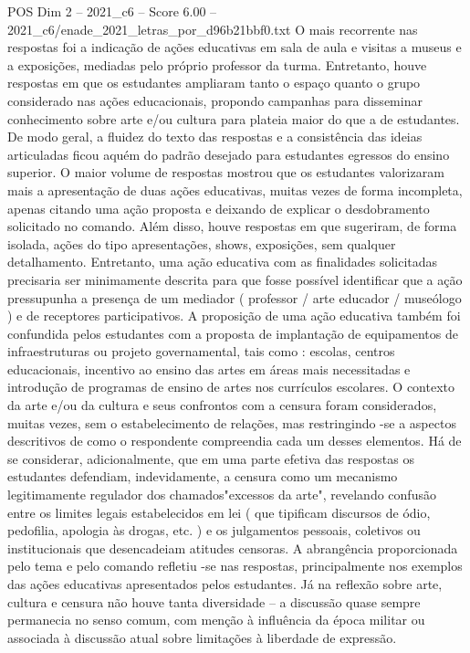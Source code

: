 \begin{textsample}{POS Dim 2 – 2021\_c6 – Score 6.00 – 2021\_c6/enade\_2021\_letras\_por\_d96b21bbf0.txt}
O mais recorrente nas respostas foi a indicação de ações educativas em sala de aula e visitas a museus e a exposições, mediadas pelo próprio professor da turma.
Entretanto, houve respostas em que os estudantes ampliaram tanto o espaço quanto o grupo considerado nas ações educacionais, propondo campanhas para disseminar conhecimento sobre arte e/ou cultura para plateia maior do que a de estudantes.
De modo geral, a fluidez do texto das respostas e a consistência das ideias articuladas ficou aquém do padrão desejado para estudantes egressos do ensino superior.
O maior volume de respostas mostrou que os estudantes valorizaram mais a apresentação de duas ações educativas, muitas vezes de forma incompleta, apenas citando uma ação proposta e deixando de explicar o desdobramento solicitado no comando.
Além disso, houve respostas em que sugeriram, de forma isolada, ações do tipo apresentações, shows, exposições, sem qualquer detalhamento.
Entretanto, uma ação educativa com as finalidades solicitadas precisaria ser minimamente descrita para que fosse possível identificar que a ação pressupunha a presença de um mediador ( professor / arte educador / museólogo ) e de receptores participativos.
A proposição de uma ação educativa também foi confundida pelos estudantes com a proposta de implantação de equipamentos de infraestruturas ou projeto governamental, tais como : escolas, centros educacionais, incentivo ao ensino das artes em áreas mais necessitadas e introdução de programas de ensino de artes nos currículos escolares.
O contexto da arte e/ou da cultura e seus confrontos com a censura foram considerados, muitas vezes, sem o estabelecimento de relações, mas restringindo -se a aspectos descritivos de como o respondente compreendia cada um desses elementos.
Há de se considerar, adicionalmente, que em uma parte efetiva das respostas os estudantes defendiam, indevidamente, a censura como um mecanismo legitimamente regulador dos chamados"excessos da arte", revelando confusão entre os limites legais estabelecidos em lei ( que tipificam discursos de ódio, pedofilia, apologia às drogas, etc. ) e os julgamentos pessoais, coletivos ou institucionais que desencadeiam atitudes censoras.
A abrangência proporcionada pelo tema e pelo comando refletiu -se nas respostas, principalmente nos exemplos das ações educativas apresentados pelos estudantes.
Já na reflexão sobre arte, cultura e censura não houve tanta diversidade – a discussão quase sempre permanecia no senso comum, com menção à influência da época militar ou associada à discussão atual sobre limitações à liberdade de expressão.

\end{textsample}
